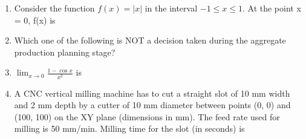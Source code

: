 \documentclass[journal,12pt,onecolumn]{IEEEtran}
\begin{document}
\begin{enumerate}
    \item Consider the function \(f(x) = |x|\) in the interval \(-1 \leq x \leq 1\). At the point x = 0, f(x) is

          \begin{enumerate}
          \end{enumerate}

    \item Which one of the following is NOT a decision taken during the aggregate production planning stage?

          \begin{enumerate}
          \end{enumerate}

    \item \(\lim_{x \to 0} \frac{1-\cos x}{x^2}\) is

          \begin{enumerate}
          \end{enumerate}

    \item A CNC vertical milling machine has to cut a straight slot of 10 mm width and 2 mm depth by a cutter of 10 mm diameter between points (0, 0) and (100, 100) on the XY plane (dimensions in mm). The feed rate used for milling is 50 mm/min. Milling time for the slot (in seconds) is


\end{enumerate}
\end{document}
